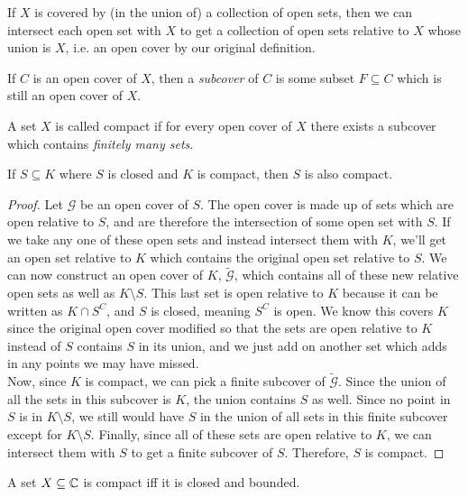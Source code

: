 \begin{lemma}
If $X$ is covered by (in the union of) a collection of open sets, then we can intersect each open set with $X$ to get a collection of open sets relative to $X$ whose union is $X$, i.e. an open cover by our original definition.
\end{lemma}
\begin{definition}[Subcover]
If $C$ is an open cover of $X$, then a \emph{subcover} of $C$ is some subset $F \subseteq C$ which is still an open cover of $X$.
\end{definition}
\begin{definition}[Compactness]
A set $X$ is called compact if for every open cover of $X$ there exists a subcover which contains \emph{finitely many sets}.
\end{definition}
\begin{lemma}
If $S \subseteq K$ where $S$ is closed and $K$ is compact, then $S$ is also compact.
\end{lemma}
\begin{proof}
Let $\mathcal{G}$ be an open cover of $S$. The open cover is made up of sets which are open relative to $S$, and are therefore the intersection of some open set with $S$. If we take any one of these open sets and instead intersect them with $K$, we'll get an open set relative to $K$ which contains the original open set relative to $S$. We can now construct an open cover of $K$, $\tilde{\mathcal{G}}$, which contains all of these new relative open sets as well as $K \setminus S$. This last set is open relative to $K$ because it can be written as $K \cap S^C$, and $S$ is closed, meaning $S^C$ is open. We know this covers $K$ since the original open cover modified so that the sets are open relative to $K$ instead of $S$ contains $S$ in its union, and we just add on another set which adds in any points we may have missed.\\
Now, since $K$ is compact, we can pick a finite subcover of $\tilde{\mathcal{G}}$. Since the union of all the sets in this subcover is $K$, the union contains $S$ as well. Since no point in $S$ is in $K\setminus S$, we still would have $S$ in the union of all sets in this finite subcover except for $K \setminus S$. Finally, since all of these sets are open relative to $K$, we can intersect them with $S$ to get a finite subcover of $S$. Therefore, $S$ is compact.
\end{proof}
\begin{theorem}
A set $X \subseteq \mathbb{C}$ is compact iff it is closed and bounded.
\end{theorem}
